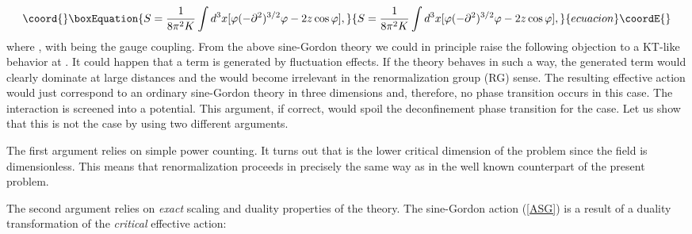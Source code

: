 \documentclass[a4paper,showpacs,preprintnumbers,amsmath,amssymb,prl,twocolumn]{revtex4}
\begin{document}
\begin{equation}\coord{}\boxEquation{
\label{ASG}
S=\frac{1}{8\pi^2K}
\int d^3 x[\varphi(-\partial^2)^{3/2}\varphi
-2z\cos\varphi], 
}{
S=\frac{1}{8\pi^2K}
\int d^3 x[\varphi(-\partial^2)^{3/2}\varphi
-2z\cos\varphi], 
}{ecuacion}\coordE{}\end{equation}
where \coordHE{}, with \coordHE{} being the gauge coupling. From the above sine-Gordon 
theory we could in principle raise the following objection to a KT-like behavior 
at \coordHE{}. It could happen that a \coordHE{} term is generated 
by fluctuation effects. If the theory behaves in such a way, the generated term 
would clearly dominate at large distances and the \coordHE{} 
would become irrelevant in the renormalization group (RG) sense. The resulting effective 
action would just correspond to an ordinary sine-Gordon theory in three dimensions and, 
therefore, no phase transition occurs in this case. The \coordHE{} interaction is screened 
into a \coordHE{} potential. This argument, if correct, would spoil the deconfinement phase 
transition for the \coordHE{} case. Let us show that this is not the case by using two 
different arguments. 

The first argument relies on simple 
power counting. It turns out that \coordHE{} is the lower 
critical dimension of the problem since the field 
\myHighlight{$\varphi$}\coordHE{} is dimensionless. This means that renormalization 
proceeds in precisely the same way as in the \coordHE{} well known 
counterpart of the present problem. 

The second argument relies 
on {\it exact} scaling and duality properties of the 
theory. The sine-Gordon action (\ref{ASG}) is a result of 
a duality transformation of the {\it critical} effective 
action:
\end{document}
